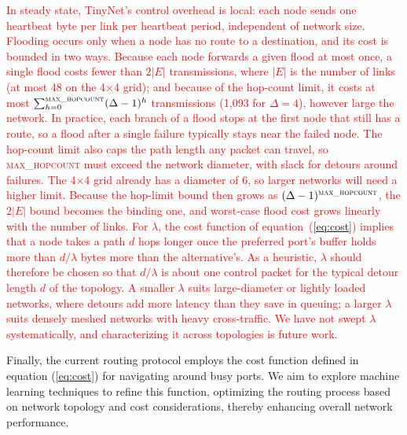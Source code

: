 \textcolor{red}{In steady state, TinyNet's control overhead is local: each node sends one heartbeat byte per link per heartbeat period, independent of network size. Flooding occurs only when a node has no route to a destination, and its cost is bounded in two ways. Because each node forwards a given flood at most once, a single flood costs fewer than $2|E|$ transmissions, where $|E|$ is the number of links (at most 48 on the 4$\times$4 grid); and because of the hop-count limit, it costs at most $\sum_{h=0}^{\textsc{max\_hopcount}}(\Delta-1)^{h}$ transmissions (1{,}093 for $\Delta = 4$), however large the network. In practice, each branch of a flood stops at the first node that still has a route, so a flood after a single failure typically stays near the failed node. The hop-count limit also caps the path length any packet can travel, so \textsc{max\_hopcount} must exceed the network diameter, with slack for detours around failures. The 4$\times$4 grid already has a diameter of 6, so larger networks will need a higher limit. Because the hop-limit bound then grows as $(\Delta-1)^{\textsc{max\_hopcount}}$, the $2|E|$ bound becomes the binding one, and worst-case flood cost grows linearly with the number of links. For $\lambda$, the cost function of equation~(\ref{eq:cost}) implies that a node takes a path $d$ hops longer once the preferred port's buffer holds more than $d/\lambda$ bytes more than the alternative's. As a heuristic, $\lambda$ should therefore be chosen so that $d/\lambda$ is about one control packet for the typical detour length $d$ of the topology. A smaller $\lambda$ suits large-diameter or lightly loaded networks, where detours add more latency than they save in queuing; a larger $\lambda$ suits densely meshed networks with heavy cross-traffic. We have not swept $\lambda$ systematically, and characterizing it across topologies is future work.}

Finally, the current routing protocol employs the cost function defined in equation (\ref{eq:cost}) for navigating around busy ports. We aim to explore machine learning techniques to refine this function, optimizing the routing process based on network topology and cost considerations, thereby enhancing overall network performance.
